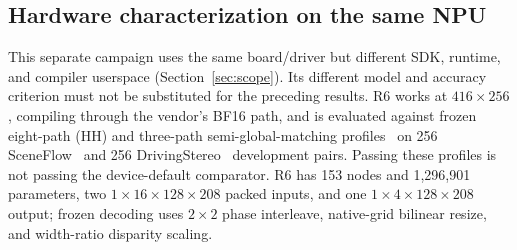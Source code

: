 \documentclass[sigconf,review,anonymous]{acmart}
\begin{document}
\subsection{Hardware characterization on the same NPU}
\label{sec:hw}
This separate campaign uses the same board/driver but different SDK, runtime, and compiler userspace (Section~\ref{sec:scope}). Its different model and accuracy criterion must not be substituted for the preceding results. R6 works at $416\times256$, compiling through the vendor's BF16 path, and is evaluated against frozen eight-path (HH) and three-path semi-global-matching profiles~\cite{rbq_hirschmuller2008sgm} on 256 SceneFlow~\cite{rbq_mayer2016sceneflow} and 256 DrivingStereo~\cite{drivingstereo} development pairs. Passing these profiles is not passing the device-default comparator. R6 has 153 nodes and 1,296,901 parameters, two $1\times16\times128\times208$ packed inputs, and one $1\times4\times128\times208$ output; frozen decoding uses $2\times2$ phase interleave, native-grid bilinear resize, and width-ratio disparity scaling.
\end{document}
